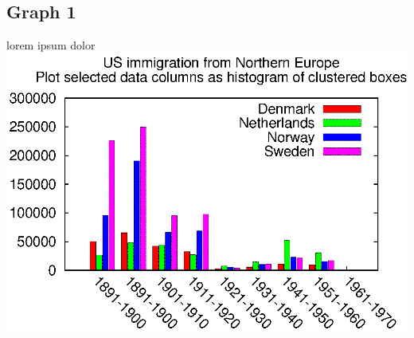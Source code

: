 \documentclass[11pt,titlepage]{article}
\begin{document}
\subsection{Graph 1}
lorem ipsum dolor
\includegraphics{graphs/immigration.eps}
\newpage
\thispagestyle{empty}
\end{document}
